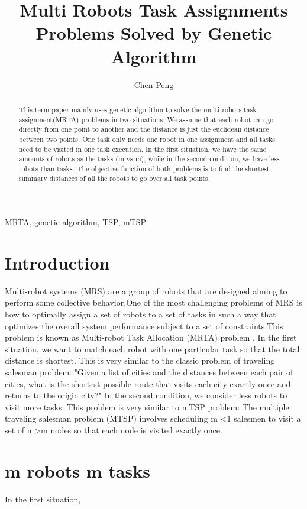 \documentclass[a4paper]{article}
\title{Multi Robots Task Assignments Problems Solved by Genetic Algorithm}
\author{\underline{Chen Peng}
\address[A1]{\it{Mechanical and Aerospace Engineering Department,
UC, Davis, US (penchen@ucdavis.edu, )}}}
\begin{document}

\begin{abstract}
This term paper mainly uses genetic algorithm to solve the multi robots task assignment(MRTA) problems in two situations. We assume that each robot can go directly from one point to another and the distance is just the euclidean distance between two points. One task only needs one robot in one assignment and all tasks need to be visited in one task execution. In the first situation, we have the same amounts of robots as the tasks (m vs m), while in the second condition, we have less robots than tasks. The objective function of both problems is to find the shortest summary distances of all the robots to go over all task points. 
\end{abstract}
\begin{keyword}
MRTA, genetic algorithm, TSP, mTSP
\end{keyword}

\maketitle


\section{Introduction}

Multi-robot systems (MRS) are a group of robots that are designed
aiming to perform some collective behavior.One of the most challenging problems of MRS is how to optimally assign a set of robots to a set of tasks in such a way that optimizes the overall system performance subject to a set of constraints.This problem is known as Multi-robot Task Allocation (MRTA) problem \cite{MRTASOFA}. In the first situation, we want to match each robot with one particular task so that the total distance is shortest. This is very similar to the classic problem of traveling salesman problem: "Given a list of cities and the distances between each pair of cities, what is the shortest possible route that visits each city exactly once and returns to the origin city?"\cite{wikiwebTSP} In the second condition, we consider less robots to visit more tasks. This problem is very similar to mTSP problem: The multiple traveling salesman problem (MTSP) involves scheduling m \textless 1 salesmen to visit a set of n \textgreater m nodes so that each node is visited exactly once.\cite{sedighpour2012effective} 

\section{m robots m tasks}
In the first situation, 
\end{document}
